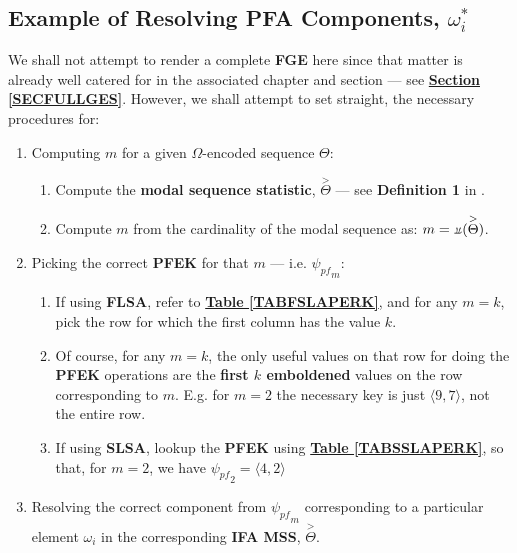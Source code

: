 \documentclass[a4paper, 18pt]{book} %
\newcommand{\invpi}{\rotatebox[origin=c]{180}{$\pi$}}
\begin{document}
\begin{appendices}
\subsection{Example of Resolving PFA Components, $\boxed{\omega_i^*}$}

We shall not attempt to render a complete \textbf{FGE} here since that matter is already well catered for in the associated chapter and section --- see \textbf{\hyperref[SECFULLGES]{Section \ref{SECFULLGES}}}. However, we shall attempt to set straight, the necessary procedures for:

\begin{enumerate}
\item{Computing $m$ for a given $\Omega$-encoded sequence $\Theta$:

\begin{enumerate}
\item Compute the \textbf{modal sequence statistic}, $\overset{>}{\Theta}$ --- see \textbf{Definition 1} in \cite{transformatics}.
\item Compute $m$ from the cardinality of the modal sequence as: $m = \invpi(\overset{>}{\Theta})$.
\end{enumerate}
}
\item {Picking the correct \textbf{PFEK} for that $m$ --- i.e. $\boxed{\psi_{pf}}_m$:
	\begin{enumerate}
	\item If using \textbf{FLSA}, refer to \textbf{\hyperref[TABFSLAPERK]{Table \ref{TABFSLAPERK}}}, and for any $m = k$, pick the row for which the first column has the value $k$.
	\item Of course, for any $m = k$, the only useful values on that row for doing the \textbf{PFEK} operations are the \textbf{first $k$ emboldened} values on the row corresponding to $m$. E.g. for $m=2$ the necessary key is just $\langle 9, 7 \rangle$, not the entire row.
	\item If using \textbf{SLSA}, lookup the \textbf{PFEK} using \textbf{\hyperref[TABSSLAPERK]{Table \ref{TABSSLAPERK}}}, so that, for $m = 2$, we have $\boxed{\psi_{pf}}_2 = \langle 4, 2 \rangle $
	\end{enumerate}
}
\item{ Resolving the correct component from $\boxed{\psi_{pf}}_m$ corresponding to a particular element $\omega_i$ in the corresponding \textbf{IFA MSS}, $\overset{>}{\Theta}$.
\begin{enumerate}

\end{enumerate}}
\end{enumerate}
\end{appendices}
\end{document}

